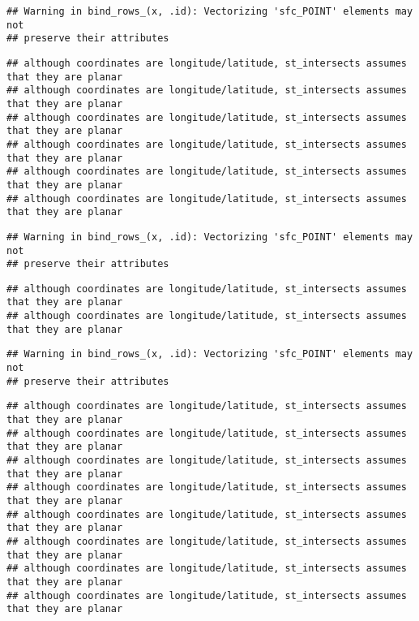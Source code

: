 \documentclass[]{article}
\begin{document}
\begin{verbatim}
## Warning in bind_rows_(x, .id): Vectorizing 'sfc_POINT' elements may not
## preserve their attributes
\end{verbatim}

\begin{verbatim}
## although coordinates are longitude/latitude, st_intersects assumes that they are planar
## although coordinates are longitude/latitude, st_intersects assumes that they are planar
## although coordinates are longitude/latitude, st_intersects assumes that they are planar
## although coordinates are longitude/latitude, st_intersects assumes that they are planar
## although coordinates are longitude/latitude, st_intersects assumes that they are planar
## although coordinates are longitude/latitude, st_intersects assumes that they are planar
\end{verbatim}

\begin{verbatim}
## Warning in bind_rows_(x, .id): Vectorizing 'sfc_POINT' elements may not
## preserve their attributes
\end{verbatim}

\begin{verbatim}
## although coordinates are longitude/latitude, st_intersects assumes that they are planar
## although coordinates are longitude/latitude, st_intersects assumes that they are planar
\end{verbatim}

\begin{verbatim}
## Warning in bind_rows_(x, .id): Vectorizing 'sfc_POINT' elements may not
## preserve their attributes
\end{verbatim}

\begin{verbatim}
## although coordinates are longitude/latitude, st_intersects assumes that they are planar
## although coordinates are longitude/latitude, st_intersects assumes that they are planar
## although coordinates are longitude/latitude, st_intersects assumes that they are planar
## although coordinates are longitude/latitude, st_intersects assumes that they are planar
## although coordinates are longitude/latitude, st_intersects assumes that they are planar
## although coordinates are longitude/latitude, st_intersects assumes that they are planar
## although coordinates are longitude/latitude, st_intersects assumes that they are planar
## although coordinates are longitude/latitude, st_intersects assumes that they are planar
\end{verbatim}
\end{document}
